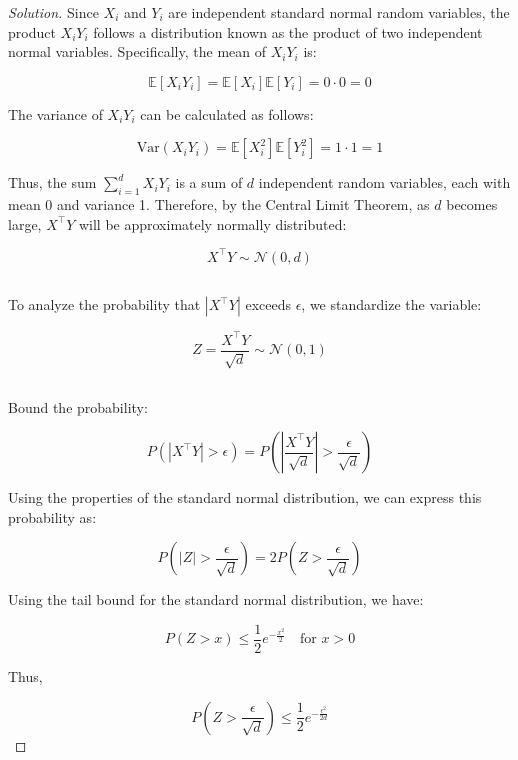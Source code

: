 \documentclass[12pt]{article}
\newenvironment{solution}{\begin{proof}[Solution]}{\end{proof}}
\begin{document}
\begin{solution}
    Since \( X_i \) and \( Y_i \) are independent standard normal random variables, the product \( X_i Y_i \) follows a distribution known as the product of two independent normal variables. Specifically, the mean of \( X_i Y_i \) is:
    
    \[
    \mathbb{E}[X_i Y_i] = \mathbb{E}[X_i] \mathbb{E}[Y_i] = 0 \cdot 0 = 0
    \]
    
    The variance of \( X_i Y_i \) can be calculated as follows:
    
    \[
    \text{Var}(X_i Y_i) = \mathbb{E}[X_i^2] \mathbb{E}[Y_i^2] = 1 \cdot 1 = 1
    \]
    
    Thus, the sum \( \sum_{i=1}^d X_i Y_i \) is a sum of \( d \) independent random variables, each with mean 0 and variance 1. Therefore, by the Central Limit Theorem, as \( d \) becomes large, \( X^\top Y \) will be approximately normally distributed:
    
    \[
    X^\top Y \sim \mathcal{N}(0, d)
    \]
    
    \subsection*{}
    
    To analyze the probability that \( |X^\top Y| \) exceeds \( \epsilon \), we standardize the variable:
    
    \[
    Z = \frac{X^\top Y}{\sqrt{d}} \sim \mathcal{N}(0, 1)
    \]
    
    \subsection*{}
    
    Bound the probability:
    
    \[
    P(|X^\top Y| > \epsilon) = P\left(\left| \frac{X^\top Y}{\sqrt{d}} \right| > \frac{\epsilon}{\sqrt{d}}\right)
    \]
    
    Using the properties of the standard normal distribution, we can express this probability as:
    
    \[
    P(|Z| > \frac{\epsilon}{\sqrt{d}}) = 2P(Z > \frac{\epsilon}{\sqrt{d}})
    \]
    
    Using the tail bound for the standard normal distribution, we have:
    
    \[
    P(Z > x) \leq \frac{1}{2} e^{-\frac{x^2}{2}} \quad \text{for } x > 0
    \]
    
    Thus,
    
    \[
    P(Z > \frac{\epsilon}{\sqrt{d}}) \leq \frac{1}{2} e^{-\frac{\epsilon^2}{2d}}
    \]
    

\end{solution}
\end{document}
